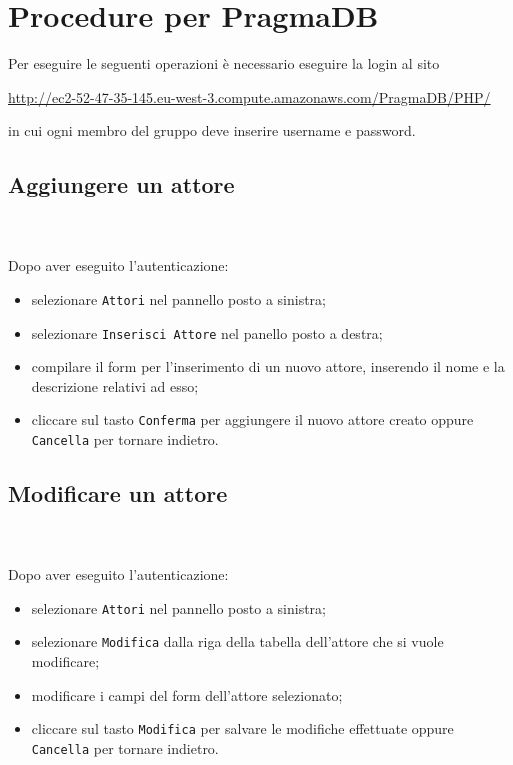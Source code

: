 \section{Procedure per PragmaDB}	
	Per eseguire le seguenti operazioni è necessario eseguire la login al sito 
	\\
	\centerline{\url{http://ec2-52-47-35-145.eu-west-3.compute.amazonaws.com/PragmaDB/PHP/}}
	in cui ogni membro del gruppo deve inserire username e password.
	
	\subsection{Aggiungere un attore} \mbox{}\\ \mbox{}\\
	Dopo aver eseguito l'autenticazione:
	\begin{itemize}
		\item selezionare \texttt{Attori} nel pannello posto a sinistra;
		\item selezionare \texttt{Inserisci Attore} nel panello posto a destra;
		\item compilare il form per l'inserimento di un nuovo attore, inserendo 
		il nome e la descrizione relativi ad esso;
		\item cliccare sul tasto \texttt{Conferma} per aggiungere il nuovo 
		attore 
		creato oppure \texttt{Cancella} per tornare indietro.	
	\end{itemize}
	
	\subsection{Modificare un attore} \mbox{}\\ \mbox{}\\
	Dopo aver eseguito l'autenticazione:
	\begin{itemize}
		\item selezionare \texttt{Attori} nel pannello posto a sinistra;
		\item selezionare \texttt{Modifica} dalla riga della tabella dell'attore
		che si vuole modificare;
		\item modificare i campi del form dell'attore selezionato;
		\item cliccare sul tasto \texttt{Modifica} per salvare le modifiche 
		effettuate
		oppure \texttt{Cancella} per tornare indietro.	
	\end{itemize}
	

